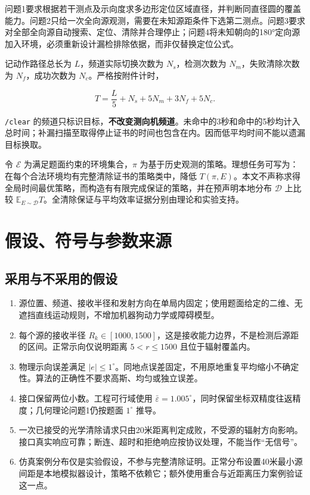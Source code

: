 \documentclass[
  chinese,
  UTF8,
  a4paper,
  zihao=-4]{ctexart}
\providecommand{\tightlist}{%
  \setlength{\itemsep}{0pt}\setlength{\parskip}{0pt}}
\begin{document}
问题1要求根据若干测点及示向度求多边形定位区域直径，并判断同直径圆的覆盖能力。问题2只给一次全向源观测，需要在未知源距条件下选第二测点。问题3要求对全部全向源自动搜索、定位、清除并合理停止；问题4将未知朝向的180°定向源加入环境，必须重新设计漏检排除依据，而非仅替换定位公式。

记动作路径总长为 \(L\)，频道实际切换次数为 \(N_s\)，检测次数为
\(N_m\)，失败清除次数为 \(N_f\)，成功次数为 \(N_c\)。严格按附件计时，

\[
T=\frac{L}{5}+N_s+5N_m+3N_f+5N_c. \tag{1}
\]

\texttt{/clear}
的频道只标识目标，\textbf{不改变测向机频道}。未命中的3秒和命中的5秒均计入总时间；补漏扫描至取得停止证书的时间也包含在内。因而低平均时间不能以遗漏目标换取。

令 \(\mathcal E\) 为满足题面约束的环境集合，\(\pi\)
为基于历史观测的策略。理想任务可写为：在每个合法环境均有完整清除证书的策略类中，降低
\(T(\pi,E)\)。本文不声称求得全局时间最优策略，而构造有有限完成保证的策略，并在预声明本地分布
\(\mathcal D\) 上比较
\(\mathbb E_{E\sim\mathcal D}T\)。全清除保证与平均效率证据分别由理论和实验支持。

\section{假设、符号与参数来源}\label{ux5047ux8bbeux7b26ux53f7ux4e0eux53c2ux6570ux6765ux6e90}

\subsection{采用与不采用的假设}\label{ux91c7ux7528ux4e0eux4e0dux91c7ux7528ux7684ux5047ux8bbe}

\begin{enumerate}
\def\labelenumi{\arabic{enumi}.}
\tightlist
\item
  源位置、频道、接收半径和发射方向在单局内固定；使用题面给定的二维、无遮挡直线运动规则，不增加机器狗动力学或障碍模型。
\item
  每个源的接收半径
  \(R_k\in[1000,1500]\)，这是接收能力边界，不是检测后源距的区间。正常示向仅说明距离
  \(5<r\le1500\) 且位于辐射覆盖内。
\item
  物理示向误差满足
  \(|e|\le1^\circ\)。同地点误差固定，不用原地重复平均缩小不确定性。算法的正确性不要求高斯、均匀或独立误差。
\item
  接口保留两位小数。工程可行域使用
  \(\bar\varepsilon=1.005^\circ\)，同时保留坐标双精度往返精度；几何理论问题1仍按题面
  \(1^\circ\) 推导。
\item
  一次已接受的光学清除请求只由20米距离判定成败，不受源的辐射方向影响。接口真实响应可靠；断连、超时和拒绝响应按协议处理，不能当作``无信号''。
\item
  仿真案例分布仅是实验假设，不参与完整清除证明。正常分布设置40米最小源间距是本地模拟器设计，策略不依赖它；额外使用重合与近距离压力案例验证这一点。
\end{enumerate}
\end{document}
